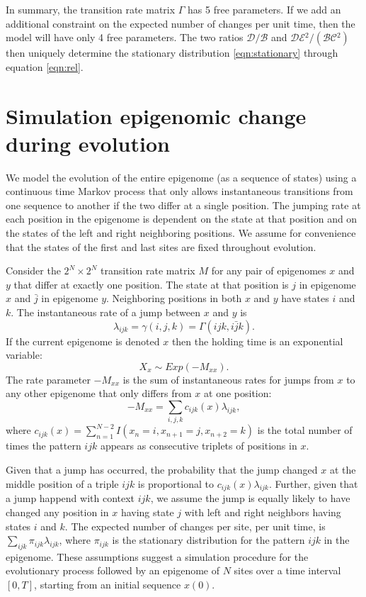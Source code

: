 \documentclass[11pt]{article}
\newcommand{\birth}{\ensuremath{\mathcal{B}}}
\newcommand{\death}{\ensuremath{\mathcal{D}}}
\newcommand{\expansion}{\ensuremath{\mathcal{E}}}
\newcommand{\contraction}{\ensuremath{\mathcal{C}}}
\begin{document}
In summary, the transition rate matrix $\Gamma$ has 5 free
parameters. If we add an additional constraint on the expected number
of changes per unit time, then the model will have only 4 free
parameters. The two ratios $\death{}/\birth{}$ and
$\death{}\expansion{}^2/(\birth{}\contraction{}^2)$ then uniquely
determine the stationary distribution \eqref{eqn:stationary} through
equation \eqref{eqn:rel}.

\section{Simulation epigenomic change during evolution}


We model the evolution of the entire epigenome (as a sequence of
states) using a continuous time Markov process that only allows
instantaneous transitions from one sequence to another if the two
differ at a single position. The jumping rate at each position in the
epigenome is dependent on the state at that position and on the states
of the left and right neighboring positions. We assume for convenience
that the states of the first and last sites are fixed throughout
evolution.

Consider the $2^N \times 2^N$ transition rate matrix $M$ for any pair
of epigenomes $x$ and $y$ that differ at exactly one position. The
state at that position is $j$ in epigenome $x$ and $\bar{j}$ in
epigenome $y$. Neighboring positions in both $x$ and $y$ have states
$i$ and $k$. The instantaneous rate of a jump between $x$ and $y$
is
\[
\lambda_{ijk} = \gamma(i, j, k) = \Gamma(ijk, i\bar{j}k).
\]
If the current epigenome is denoted $x$ then the holding time
is an exponential variable:
\[
  X_x\sim \mathit{Exp}(-M_{xx}).
\]
The rate parameter $-M_{xx}$ is the sum of instantaneous rates for
jumps from $x$ to any other epigenome that only differs from $x$ at
one position:
\[
  -M_{xx} =  \sum\limits_{i,j,k}c_{ijk}(x)\lambda_{ijk},
\]
where $c_{ijk}(x) = \sum_{n=1}^{N-2}I(x_{n}=i, x_{n+1}=j, x_{n+2}=k)$
is the total number of times the pattern $ijk$ appears as consecutive
triplets of positions in $x$.

Given that a jump has occurred, the probability that the jump changed
$x$ at the middle position of a triple $ijk$ is proportional to
$c_{ijk}(x)\lambda_{ijk}$. Further, given that a jump happend with
context $ijk$, we assume the jump is equally likely to have changed
any position in $x$ having state $j$ with left and right neighbors
having states $i$ and $k$.
The expected number of changes per site, per unit time, is
$\sum_{ijk}\pi_{ijk}\lambda_{ijk}$, where $\pi_{ijk}$ is the
stationary distribution for the pattern $ijk$ in the epigenome.
These assumptions suggest a simulation procedure for the evolutionary
process followed by an epigenome of $N$ sites over a time interval
$[0, T]$, starting from an initial sequence $x(0)$.
\end{document}
